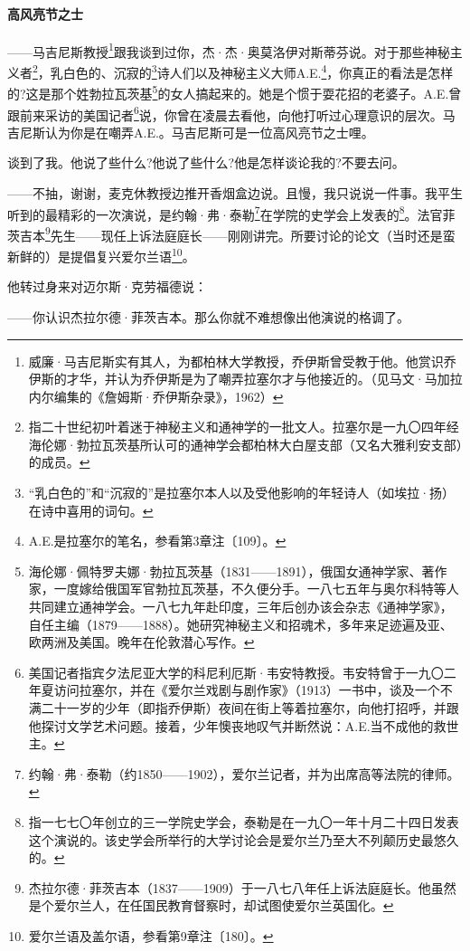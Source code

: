 \paragraph*{高风亮节之士}
\par ——马吉尼斯教授\footnote{威廉·马吉尼斯实有其人，为都柏林大学教授，乔伊斯曾受教于他。他赏识乔伊斯的才华，并认为乔伊斯是为了嘲弄拉塞尔才与他接近的。（见马文·马加拉内尔编集的《詹姆斯·乔伊斯杂录》，1962）}跟我谈到过你，杰·杰·奥莫洛伊对斯蒂芬说。对于那些神秘主义者\footnote{指二十世纪初叶着迷于神秘主义和通神学的一批文人。拉塞尔是一九〇四年经海伦娜·勃拉瓦茨基所认可的通神学会都柏林大白屋支部（又名大雅利安支部）的成员。}，乳白色的、沉寂的\footnote{“乳白色的”和“沉寂的”是拉塞尔本人以及受他影响的年轻诗人（如埃拉·扬）在诗中喜用的词句。}诗人们以及神秘主义大师A.E.\footnote{A.E.是拉塞尔的笔名，参看第3章注〔109〕。}，你真正的看法是怎样的?这是那个姓勃拉瓦茨基\footnote{海伦娜·佩特罗夫娜·勃拉瓦茨基（1831——1891），俄国女通神学家、著作家，一度嫁给俄国军官勃拉瓦茨基，不久便分手。一八七五年与奥尔科特等人共同建立通神学会。一八七九年赴印度，三年后创办该会杂志《通神学家》，自任主编（1879——1888）。她研究神秘主义和招魂术，多年来足迹遍及亚、欧两洲及美国。晚年在伦敦潜心写作。}的女人搞起来的。她是个惯于耍花招的老婆子。A.E.曾跟前来采访的美国记者\footnote{美国记者指宾夕法尼亚大学的科尼利厄斯·韦安特教授。韦安特曾于一九〇二年夏访问拉塞尔，并在《爱尔兰戏剧与剧作家》（1913）一书中，谈及一个不满二十一岁的少年（即指乔伊斯）夜间在街上等着拉塞尔，向他打招呼，并跟他探讨文学艺术问题。接着，少年懊丧地叹气并断然说：A.E.当不成他的救世主。}说，你曾在凌晨去看他，向他打听过心理意识的层次。马吉尼斯认为你是在嘲弄A.E.。马吉尼斯可是一位高风亮节之士哩。
\par 谈到了我。他说了些什么?他说了些什么?他是怎样谈论我的?不要去问。
\par ——不抽，谢谢，麦克休教授边推开香烟盒边说。且慢，我只说说一件事。我平生听到的最精彩的一次演说，是约翰·弗·泰勒\footnote{约翰·弗·泰勒（约1850——1902），爱尔兰记者，并为出席高等法院的律师。}在学院的史学会上发表的\footnote{指一七七〇年创立的三一学院史学会，泰勒是在一九〇一年十月二十四日发表这个演说的。该史学会所举行的大学讨论会是爱尔兰乃至大不列颠历史最悠久的。}。法官菲茨吉本\footnote{杰拉尔德·菲茨吉本（1837——1909）于一八七八年任上诉法庭庭长。他虽然是个爱尔兰人，在任国民教育督察时，却试图使爱尔兰英国化。}先生——现任上诉法庭庭长——刚刚讲完。所要讨论的论文（当时还是蛮新鲜的）是提倡复兴爱尔兰语\footnote{爱尔兰语及盖尔语，参看第9章注〔180〕。}。
\par 他转过身来对迈尔斯·克劳福德说：
\par ——你认识杰拉尔德·菲茨吉本。那么你就不难想像出他演说的格调了。
